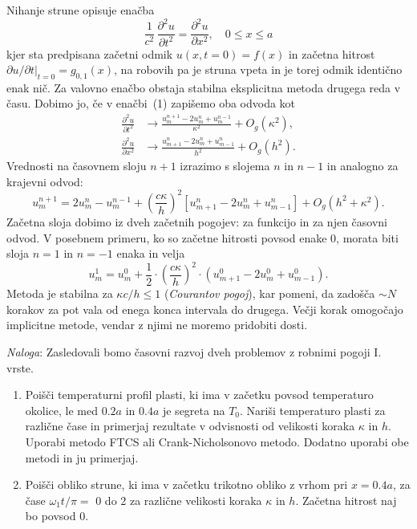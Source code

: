 \documentclass[slovene,11pt,a4paper]{article}
\begin{document}
\bigskip\noindent
Nihanje strune opisuje enačba
\[
\frac{1}{c^2} \, \frac{\partial^2 u}{\partial t^2}= \frac{\partial^{2} u}{\partial x^{2}}, \quad 0 \leq x \leq a
\]
kjer sta predpisana začetni odmik $u(x,t=0)=f(x)$ in začetna
hitrost $\partial u/\partial t|_{t=0} =g_{0,1}(x)$, na robovih pa je struna vpeta in je torej odmik identično enak nič. 
Za valovno enačbo obstaja
stabilna eksplicitna metoda drugega reda v času. Dobimo jo, če v
enačbi~(1) zapišemo oba odvoda kot
\begin{eqnarray*}
\frac{\partial^2 u}{\partial t^2} & \rightarrow \frac{u_{m}^{n+1}-2 u_{m}^{n}+u_{m}^{n-1}}{\kappa^{2}}+O_g\left(\kappa^{2}\right),\\[3pt]
\frac{\partial^2 u}{\partial x^2} & \rightarrow \frac{u_{m+1}^{n}-2 u_{m}^{n}+u_{m-1}^{n}}{h^{2}}+O_g\left(h^{2}\right).
\end{eqnarray*}
Vrednosti na časovnem sloju $n+1$ izrazimo s slojema $n$ in $n-1$ in analogno za krajevni odvod:
\[u_{m}^{n+1} =  2 u_{m}^{n} - u_{m}^{n-1} +  \left(\frac{c \kappa}{h}\right)^2 \left[u_{m+1}^{n}-2 u_{m}^{n}+u_{m-1}^{n}\right] +
 O_g\left(h^{2}+\kappa^2 \right).
\]
Začetna sloja dobimo iz dveh začetnih pogojev: za funkcijo in za
njen časovni odvod. V posebnem primeru, ko so začetne hitrosti
povsod enake 0, morata biti sloja $n=1$ in $n=-1$ enaka in velja
\[
u_{m}^{1} =
u_{m}^{0} + {\frac{1}{2}}\cdot \left(\frac{c\kappa}{h}\right)^2 \cdot (u_{m+1}^{0} -2 u_{m}^{0}+u_{m-1}^{0}).
\]
Metoda je stabilna za $\kappa c/h \leq 1$ (\emph{Courantov pogoj}), kar pomeni, da zadošča
$\sim N$ korakov za pot vala od enega konca intervala do drugega.
Večji korak omogočajo implicitne metode, vendar z njimi ne
moremo pridobiti dosti.

\medskip

{\it Naloga\/}: Zasledovali bomo časovni razvoj dveh problemov
z robnimi pogoji I. vrste.
\begin{enumerate}
\item Poišči temperaturni profil plasti, ki ima v začetku
povsod temperaturo okolice, le med $0.2a$ in $0.4a$ je segreta na $T_0$.
Nariši temperaturo plasti za različne čase in primerjaj rezultate v
odvisnosti od velikosti koraka $\kappa$ in $h$. Uporabi metodo
FTCS ali Crank-Nicholsonovo metodo. Dodatno uporabi obe metodi in
ju primerjaj.


\item Poišči obliko strune, ki ima v začetku trikotno obliko
z vrhom pri $x=0.4a$, za čase $\omega_1 t/\pi =$ 0 do 2 za 
različne velikosti koraka $\kappa$ in $h$.
Začetna hitrost naj bo povsod 0.
\end{enumerate}
\end{document}

